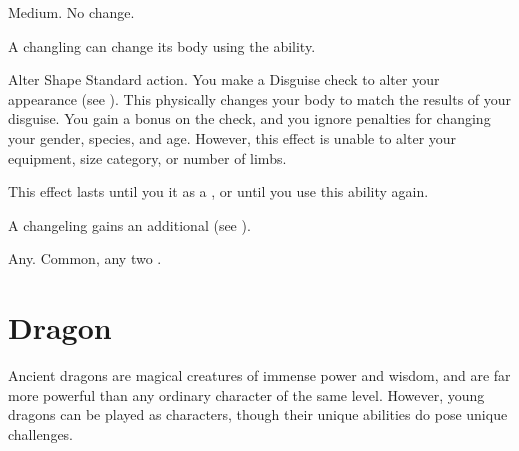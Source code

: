    Medium.
   No change.
  \begin{itemize}
     A changling can change its body using the  ability.
      \begin{activeability}{Alter Shape}
        \abilityusagetime Standard action.
        \rankline
        You make a Disguise check to alter your appearance (see ).
        This physically changes your body to match the results of your disguise.
        You gain a  bonus on the check, and you ignore penalties for changing your gender, species, and age.
        However, this effect is unable to alter your equipment, size category, or number of limbs.

        This effect lasts until you  it as a , or until you use this ability again.
      \end{activeability}
     A changeling gains an additional  (see ).
  \end{itemize}
   Any.
   Common, any two .

\section{Dragon}
  Ancient dragons are magical creatures of immense power and wisdom, and are far more powerful than any ordinary character of the same level.
  However, young dragons can be played as characters, though their unique abilities do pose unique challenges.

